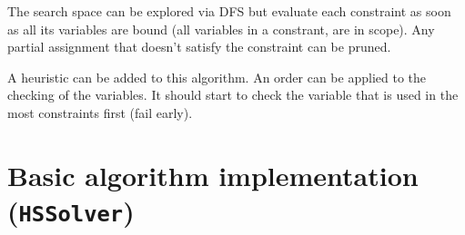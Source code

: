 \documentclass[11pt]{article}
\begin{document}
The search space can be explored via DFS but evaluate each constraint as
soon as all its variables are bound (all variables in a constrant, are
in scope). Any partial assignment that doesn't satisfy the constraint
can be pruned.

A heuristic can be added to this algorithm. An order can be applied to
the checking of the variables. It should start to check the variable
that is used in the most constraints first (fail early).

    \hypertarget{basic-algorithm-implementation-hssolver}{%
\section{\texorpdfstring{Basic algorithm implementation
(\texttt{HSSolver})}{Basic algorithm implementation (HSSolver)}}\label{basic-algorithm-implementation-hssolver}}
\end{document}
